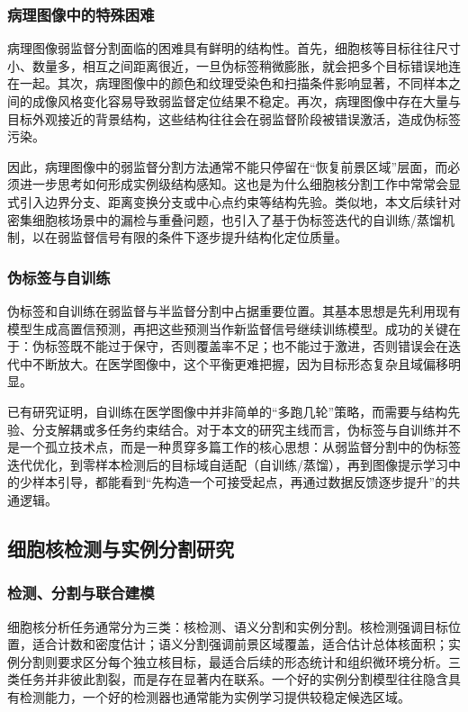 \subsubsection{病理图像中的特殊困难}
病理图像弱监督分割面临的困难具有鲜明的结构性。首先，细胞核等目标往往尺寸小、数量多，相互之间距离很近，一旦伪标签稍微膨胀，就会把多个目标错误地连在一起。其次，病理图像中的颜色和纹理受染色和扫描条件影响显著，不同样本之间的成像风格变化容易导致弱监督定位结果不稳定。再次，病理图像中存在大量与目标外观接近的背景结构，这些结构往往会在弱监督阶段被错误激活，造成伪标签污染。

因此，病理图像中的弱监督分割方法通常不能只停留在“恢复前景区域”层面，而必须进一步思考如何形成实例级结构感知。这也是为什么细胞核分割工作中常常会显式引入边界分支、距离变换分支或中心点约束等结构先验。类似地，本文后续针对密集细胞核场景中的漏检与重叠问题，也引入了基于伪标签迭代的自训练/蒸馏机制，以在弱监督信号有限的条件下逐步提升结构化定位质量。

\subsubsection{伪标签与自训练}
伪标签和自训练在弱监督与半监督分割中占据重要位置。其基本思想是先利用现有模型生成高置信预测，再把这些预测当作新监督信号继续训练模型。成功的关键在于：伪标签既不能过于保守，否则覆盖率不足；也不能过于激进，否则错误会在迭代中不断放大。在医学图像中，这个平衡更难把握，因为目标形态复杂且域偏移明显。

已有研究证明，自训练在医学图像中并非简单的“多跑几轮”策略，而需要与结构先验、分支解耦或多任务约束结合。对于本文的研究主线而言，伪标签与自训练并不是一个孤立技术点，而是一种贯穿多篇工作的核心思想：从弱监督分割中的伪标签迭代优化，到零样本检测后的目标域自适配（自训练/蒸馏），再到图像提示学习中的少样本引导，都能看到“先构造一个可接受起点，再通过数据反馈逐步提升”的共通逻辑。

\subsection{细胞核检测与实例分割研究}
\subsubsection{检测、分割与联合建模}
细胞核分析任务通常分为三类：核检测、语义分割和实例分割。核检测强调目标位置，适合计数和密度估计；语义分割强调前景区域覆盖，适合估计总体核面积；实例分割则要求区分每个独立核目标，最适合后续的形态统计和组织微环境分析。三类任务并非彼此割裂，而是存在显著内在联系。一个好的实例分割模型往往隐含具有检测能力，一个好的检测器也通常能为实例学习提供较稳定候选区域。

